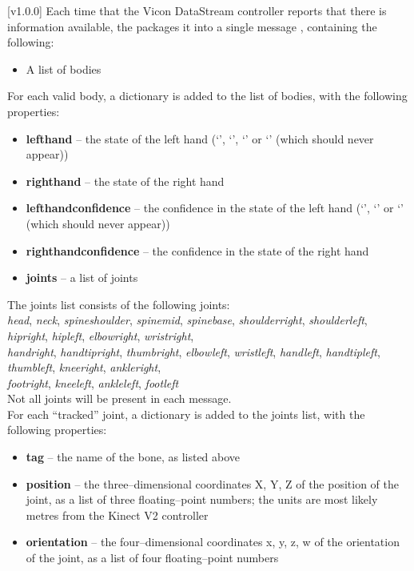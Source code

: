 [v1.0.0]
Each time that the Vicon DataStream controller reports that there is information available,
the  packages it into a single message
\openSq{}\closeSq, containing the following:
\begin{itemize}
\item A list of bodies
\end{itemize}

For each valid body, a dictionary \openSq{}\closeSq{} is added to the list
of bodies, with the following properties:
\begin{itemize}
\item \textbf{lefthand} -- the state of the left hand (`', `',
`' or `' (which should never appear))
\item \textbf{righthand} -- the state of the right hand
\item \textbf{lefthandconfidence} -- the confidence in the state of the left hand
(`', `' or `' (which should never appear))
\item \textbf{righthandconfidence} -- the confidence in the state of the right hand
\item \textbf{joints} -- a list of joints
\end{itemize}

The joints list consists of the following joints:\\
\textbraceleft{} \emph{head}, \emph{neck}, \emph{spineshoulder}, \emph{spinemid},
\emph{spinebase}, \emph{shoulderright}, \emph{shoulderleft}, \emph{hipright},
\emph{hipleft}, \emph{elbowright}, \emph{wristright},\\
\emph{handright}, \emph{handtipright}, \emph{thumbright}, \emph{elbowleft},
\emph{wristleft}, \emph{handleft}, \emph{handtipleft}, \emph{thumbleft}, \emph{kneeright},
\emph{ankleright},\\
\emph{footright}, \emph{kneeleft}, \emph{ankleleft}, \emph{footleft} \textbraceright\\

Not all joints will be present in each message.\\

For each ``tracked'' joint, a dictionary is added to the joints list, with the following
properties:
\begin{itemize}
\item \textbf{tag} -- the name of the bone, as listed above
\item \textbf{position} -- the three--dimensional coordinates \openSq{}X, Y,
Z\closeSq{} of the position of the joint, as a list of three floating--point
numbers; the units are most likely metres from the Kinect V2 controller
\item \textbf{orientation} -- the four--dimensional coordinates \openSq{}x, y,
z, w\closeSq{} of the orientation of the joint, as a list of four floating--point
numbers
\end{itemize}
\primaryEnd{}
